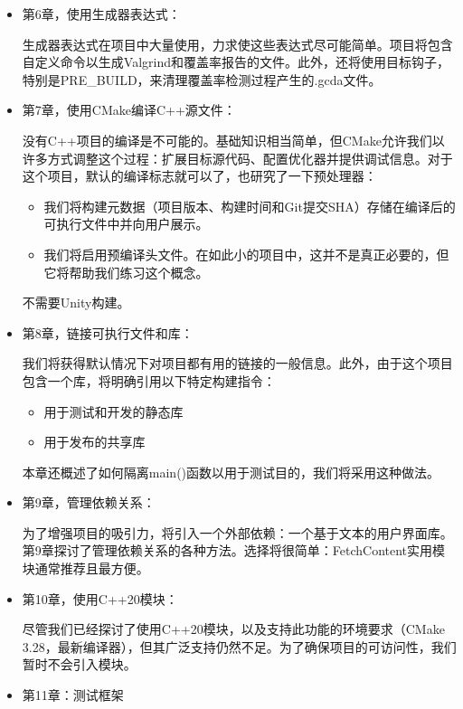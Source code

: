 \begin{itemize}
\item
第6章，使用生成器表达式：

生成器表达式在项目中大量使用，力求使这些表达式尽可能简单。项目将包含自定义命令以生成Valgrind和覆盖率报告的文件。此外，还将使用目标钩子，特别是PRE\_BUILD，来清理覆盖率检测过程产生的.gcda文件。

\item
第7章，使用CMake编译C++源文件：

没有C++项目的编译是不可能的。基础知识相当简单，但CMake允许我们以许多方式调整这个过程：扩展目标源代码、配置优化器并提供调试信息。对于这个项目，默认的编译标志就可以了，也研究了一下预处理器：

\begin{itemize}
\item
我们将构建元数据（项目版本、构建时间和Git提交SHA）存储在编译后的可执行文件中并向用户展示。

\item
我们将启用预编译头文件。在如此小的项目中，这并不是真正必要的，但它将帮助我们练习这个概念。
\end{itemize}

不需要Unity构建。

\item
第8章，链接可执行文件和库：

我们将获得默认情况下对项目都有用的链接的一般信息。此外，由于这个项目包含一个库，将明确引用以下特定构建指令：

\begin{itemize}
\item
用于测试和开发的静态库

\item
用于发布的共享库
\end{itemize}

本章还概述了如何隔离main()函数以用于测试目的，我们将采用这种做法。

\item
第9章，管理依赖关系：

为了增强项目的吸引力，将引入一个外部依赖：一个基于文本的用户界面库。第9章探讨了管理依赖关系的各种方法。选择将很简单：FetchContent实用模块通常推荐且最方便。

\item
第10章，使用C++20模块：

尽管我们已经探讨了使用C++20模块，以及支持此功能的环境要求（CMake 3.28，最新编译器），但其广泛支持仍然不足。为了确保项目的可访问性，我们暂时不会引入模块。

\item
第11章：测试框架


\end{itemize}
